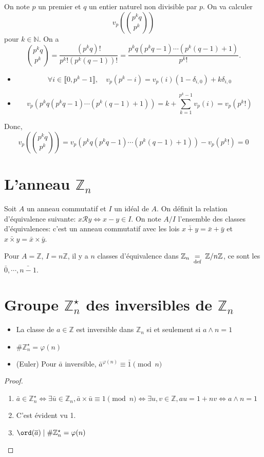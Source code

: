 On note $p$ un premier et $q$ un entier naturel non divisible par $p$. On va calculer \[
    v_p \left( \binom{p^kq}{p^k} \right)
\]
pour $k\in\mathbb N$. On a \[
    \binom{p^kq}{p^k}=\frac{(p^kq)!}{p^k!(p^k(q-1))!}=\frac{p^kq(p^kq-1)\cdots (p^k(q-1)+1)}{p^k!}.
\]
\begin{itemize}
    \item \[
            \forall i\in\llbracket 0, p^k-1\rrbracket, \quad v_p(p^k-i)=v_p(i)(1-\delta_{i,0})+k\delta_{i,0}
        \]
    \item \[
            v_p(p^kq(p^kq-1)\cdots (p^k(q-1)+1))=k+\sum_{k=1}^{p^k-1}v_p(i)=v_p(p^k!)
        \]
\end{itemize}
Donc, \[
    v_p \left( \binom{p^kq}{p^k} \right)=v_p(p^kq(p^kq-1)\cdots (p^k(q-1)+1))-v_p(p^k!)=0
\]

\section{L'anneau $\mathbb Z_n$}

Soit $A$ un anneau commutatif et $I$ un idéal de $A$. On définit la relation d'équivalence suivante: $x\mathcal Ry\iff x-y\in I$. On note $A/I$ l'ensemble des classes d'équivalences: c'est un anneau commutatif avec les lois $\bar{x+y}=\bar x+\bar y$ et $\bar{x\times y}=\bar x\times \bar y$.

Pour $A=\mathbb Z$, $I=n\mathbb Z$, il y a $n$ classes d'équivalence dans $\mathbb Z_n\;\underset{\text{def}}=\;\mathbb Z/n\mathbb Z$, ce sont les $\bar 0, \cdots , \bar{n-1}$.

\section{Groupe $\mathbb Z_n^\star$ des inversibles de $\mathbb Z_n$}

\begin{prop}
    \begin{itemize}
        \item La classe de $a\in\mathbb Z$ est inversible dans $\mathbb Z_n$ si et seulement si $a\land n=1$
        \item $\#\mathbb Z_n^\star=\varphi(n)$
        \item (Euler) Pour $\bar a$ inversible, $\bar a^{\varphi(n)}\equiv \bar 1\pmod n$
    \end{itemize}
\end{prop}

\begin{proof}~
    \begin{enumerate}
        \item $\bar a\in\mathbb Z_n^\star\iff \exists \bar u\in\mathbb Z_n, \bar a\times \bar u\equiv 1\pmod n\iff \exists u, v\in\mathbb Z, au=1+nv \iff a\land n=1$
        \item C'est évident vu 1.
        \item $\ord(\bar a)\;|\;\#\mathbb Z_n^\star=\varphi(n)$
    \end{enumerate}
\end{proof}


